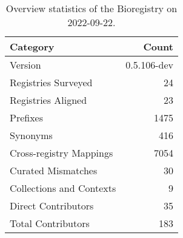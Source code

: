 \begin{table}
\centering
\caption{Overview statistics of the Bioregistry on 2022-09-22.}
\label{tab:bioregistry-summary}
\begin{tabular}{lr}
\toprule
                Category &       Count \\
\midrule
                 Version & 0.5.106-dev \\
     Registries Surveyed &          24 \\
      Registries Aligned &          23 \\
                Prefixes &        1475 \\
                Synonyms &         416 \\
 Cross-registry Mappings &        7054 \\
      Curated Mismatches &          30 \\
Collections and Contexts &           9 \\
     Direct Contributors &          35 \\
      Total Contributors &         183 \\
\bottomrule
\end{tabular}
\end{table}
